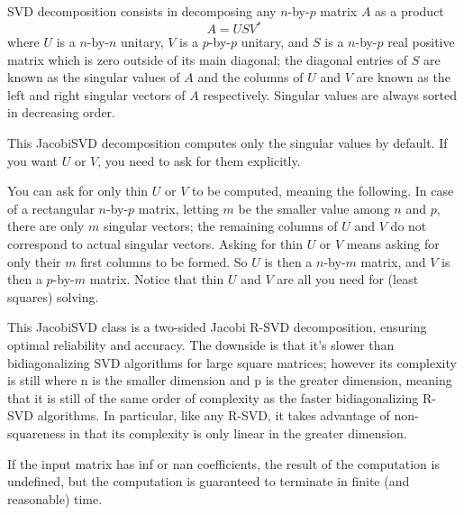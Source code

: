 SVD decomposition consists in decomposing any $n$-by-$p$ matrix $A$ as a product 
\begin{equation}
A=USV^*
\end{equation} 
where $U$ is a $n$-by-$n$ unitary, $V$ is a $p$-by-$p$ unitary, and $S$ is a $n$-by-$p$ real positive matrix which is zero outside of its main diagonal; the diagonal entries of $S$ are known as the singular values of $A$ and the columns of $U$ and $V$ are known as the left and right singular vectors of $A$ respectively.
Singular values are always sorted in decreasing order.

This JacobiSVD decomposition computes only the singular values by default. If you want $U$ or $V$, you need to ask for them explicitly.

You can ask for only thin $U$ or $V$ to be computed, meaning the following. In case of a rectangular $n$-by-$p$ matrix, letting $m$ be the smaller value among $n$ and $p$, there are only $m$ singular vectors; the remaining columns of $U$ and $V$ do not correspond to actual singular vectors. Asking for thin $U$ or $V$ means asking for only their $m$ first columns to be formed. So $U$ is then a $n$-by-$m$ matrix, and $V$ is then a $p$-by-$m$ matrix. Notice that thin $U$ and $V$ are all you need for (least squares) solving.

This JacobiSVD class is a two-sided Jacobi R-SVD decomposition, ensuring optimal reliability and accuracy. The downside is that it's slower than bidiagonalizing SVD algorithms for large square matrices; however its complexity is still  where n is the smaller dimension and p is the greater dimension, meaning that it is still of the same order of complexity as the faster bidiagonalizing R-SVD algorithms. In particular, like any R-SVD, it takes advantage of non-squareness in that its complexity is only linear in the greater dimension.

If the input matrix has inf or nan coefficients, the result of the computation is undefined, but the computation is guaranteed to terminate in finite (and reasonable) time.

